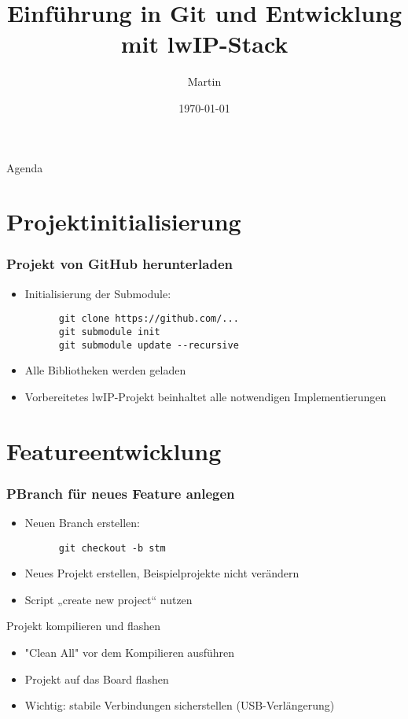 \documentclass{beamer}
\title{Einführung in Git und Entwicklung mit lwIP-Stack}
\author{Martin}
\date{\today}
\begin{document}
\begin{frame}
  \titlepage
\end{frame}

\begin{frame}{Agenda}
  \tableofcontents
\end{frame}

\section{Projektinitialisierung}
\begin{frame}[fragile]\frametitle{Projekt von GitHub herunterladen}
  \begin{itemize}
    \item Initialisierung der Submodule:
    \begin{verbatim}
      git clone https://github.com/...
      git submodule init
      git submodule update --recursive
    \end{verbatim}
    \item Alle Bibliotheken werden geladen
    \item Vorbereitetes lwIP-Projekt beinhaltet alle notwendigen Implementierungen
  \end{itemize}
\end{frame}

\section{Featureentwicklung}
\begin{frame}[fragile]\frametitle{PBranch für neues Feature anlegen}
  \begin{itemize}
    \item Neuen Branch erstellen:
    \begin{verbatim}
      git checkout -b stm
    \end{verbatim}
    \item Neues Projekt erstellen, Beispielprojekte nicht verändern
    \item Script „create new project“ nutzen
  \end{itemize}
\end{frame}

\begin{frame}{Projekt kompilieren und flashen}
  \begin{itemize}
    \item "Clean All" vor dem Kompilieren ausführen
    \item Projekt auf das Board flashen
    \item Wichtig: stabile Verbindungen sicherstellen (USB-Verlängerung)
  \end{itemize}
\end{frame}
\end{document}
